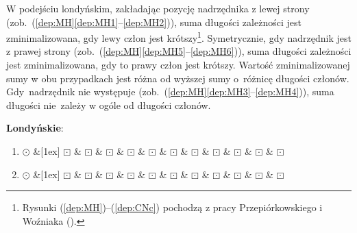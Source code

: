 \documentclass[licencjacka]{pracamgr_Kogni}
\begin{document}
    W podejściu londyńskim, zakładając pozycję nadrzędnika z lewej strony (zob.~(\ref{dep:MH}\ref{dep:MH1}--\ref{dep:MH2})), suma długości zależności jest zminimalizowana, gdy lewy człon jest krótszy\footnote{Rysunki (\ref{dep:MH})--(\ref{dep:CNc}) pochodzą z pracy Przepiórkowskiego i Woźniaka (\citeyear{Przepiorkowski2023}).}.
    Symetrycznie, gdy nadrzędnik jest z prawej strony (zob.~(\ref{dep:MH}\ref{dep:MH5}--\ref{dep:MH6})), suma długości zależności jest zminimalizowana, gdy to prawy człon jest krótszy.
    Wartość zminimalizowanej sumy w obu przypadkach jest różna od wyższej sumy o~różnicę długości członów.
    Gdy~nadrzędnik nie występuje (zob.~(\ref{dep:MH}\ref{dep:MH3}--\ref{dep:MH4})), suma długości nie~zależy w ogóle od długości członów.
    \newpage
    \begin{exe}
        \ex\label{dep:MH} \textbf{Londyńskie}:
        \begin{enumerate}[label=\alph{enumi}., ref=\alph{enumi}]
            \item 
            \begin{dependency}[baseline=-3pt, hide label, edge height=.5em]
              \begin{deptext}[column sep=.1ex]
                $\odot$  \&[1ex] $\boxdot$ \& $\boxdot$ \& $\boxdot$ \& $\boxdot$ \& $\boxdot$ \& $\boxdot$ \& $\boxdot$ \& $\boxdot$ \& $\boxdot$ \& $\boxdot$ \& $\boxdot$\\
              \end{deptext}
            \end{dependency}
            \label{dep:MH1}
          \item 
            \begin{dependency}[baseline=-3pt, hide label, edge height=.5em]
              \begin{deptext}[column sep=.1ex]
                $\odot$  \&[1ex] $\boxdot$ \& $\boxdot$ \& $\boxdot$ \& $\boxdot$ \& $\boxdot$ \& $\boxdot$ \& $\boxdot$ \& $\boxdot$ \& $\boxdot$ \& $\boxdot$ \& $\boxdot$\\
              \end{deptext}
            \end{dependency}

\end{enumerate}
\end{exe}
\end{document}
